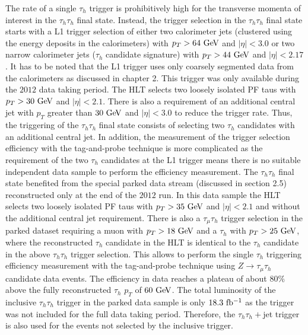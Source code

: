 The rate of a single $\tau_h$ trigger is prohibitively high for the transverse momenta of interest in the $\tau_h\tau_h$ final state. Instead, the trigger selection in the $\tau_h\tau_h$ final state starts with a L1 trigger selection of either two calorimeter jets (clustered using the energy deposits in the calorimeters) with $p_{T}>64~\mathrm{Ge\kern -0.1em V}$ and $|\eta|<3.0 $ or two narrow calorimeter jets ($\tau_h$ candidate signature) with $p_{T}>44~\mathrm{Ge\kern -0.1em V}$ and $|\eta|<2.17$. It has to be noted that the L1 trigger uses only coarsely segmented data from the calorimeters as discussed in chapter 2. This trigger was only available during the $2012$ data taking period. The HLT selects two loosely isolated  PF taus with $p_{T}>30~\mathrm{Ge\kern -0.1em V}$ and $|\eta|<2.1$. There is also  a requirement of an additional central jet with $p_{T}$ greater than $30~\mathrm{Ge\kern -0.1em V}$ and $|\eta|<3.0$ to reduce the trigger rate. Thus, the triggering of the $\tau_h\tau_h$ final state consists of selecting two $\tau_h$ candidates with an additional central jet.  In addition, the measurement of the trigger selection efficiency with the tag-and-probe technique is more complicated as the requirement of the two $\tau_h$ candidates at the L1 trigger means there is no suitable independent data sample to perform the efficiency measurement. The $\tau_{h}\tau_{h}$ final state benefited from the special parked data stream (discussed in section 2.5) reconstructed only at the end of the $2012$ run. In this data sample the HLT selects two loosely isolated  PF taus with $p_{T}>35~\mathrm{Ge\kern -0.1em V}$ and $|\eta|<2.1$ and without the additional central jet requirement. There is also a $\tau_{\mu}\tau_{h}$ trigger selection in the parked dataset requiring a muon with $p_{T}>18~\mathrm{Ge\kern -0.1em V}$ and a $\tau_h$ with $p_T>25~\mathrm{Ge\kern -0.1em V}$, where the reconstructed $\tau_h$ candidate in the HLT is identical to the $\tau_h$ candidate in the above $\tau_h\tau_h$ trigger selection. This allows to perform the single $\tau_h$ triggering efficiency measurement with the tag-and-probe technique using $Z\rightarrow\tau_{\mu}\tau_{h}$ candidate data events. The efficiency in data reaches a plateau of about $80\%$ above the fully reconstructed $\tau_h$ $p_T$ of $60~\mathrm{Ge\kern -0.1em V}$. The total luminosity of the inclusive $\tau_h\tau_h$ trigger in the parked data sample is only $18.3~\mathrm{fb^{-1}}$ as the trigger was not included for the full data taking period. Therefore, the $\tau_h\tau_h+$jet trigger is also used for the events not selected by the inclusive trigger.


